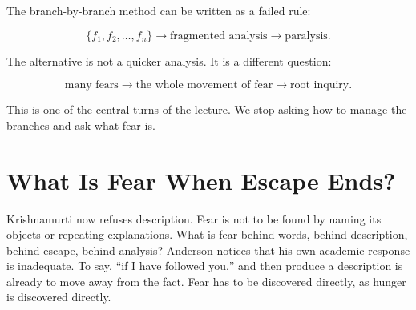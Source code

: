 The branch-by-branch method can be written as a failed rule:

\begin{equation}
\{f_1,f_2,\ldots,f_n\}
\longrightarrow
\text{fragmented analysis}
\longrightarrow
\text{paralysis}.
\end{equation}

The alternative is not a quicker analysis. It is a different question:

\begin{equation}
\text{many fears}
\longrightarrow
\text{the whole movement of fear}
\longrightarrow
\text{root inquiry}.
\end{equation}

This is one of the central turns of the lecture. We stop asking how to manage the branches and ask what fear is.

\begin{figure}
\centering
{}
\end{figure}

\section{What Is Fear When Escape Ends?}

Krishnamurti now refuses description. Fear is not to be found by naming its objects or repeating explanations. What is fear behind words, behind description, behind escape, behind analysis? Anderson notices that his own academic response is inadequate. To say, ``if I have followed you,'' and then produce a description is already to move away from the fact. Fear has to be discovered directly, as hunger is discovered directly.

